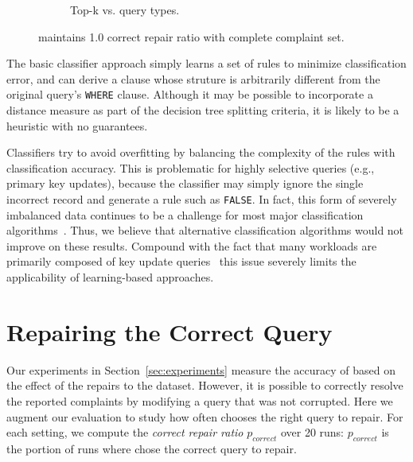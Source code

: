 \begin{description}[leftmargin=0mm, topsep=0mm, itemsep=0mm, parsep=1mm]
\begin{figure}[t]
\begin{subfigure} [t]{.3\textwidth}
    \vspace*{-.25in}
    \caption{Top-k vs. query types. }
    \vspace*{-.1in}
    \label{f:noiseratio} 
    \end{subfigure}
   \caption{ \sys maintains 1.0 correct repair ratio with complete complaint set. }
   \vspace*{-.1in}
   \label{fig:truerate}
  \end{figure}
\item [Structurally Different \texttt{WHERE} Clause Results.] 
The basic classifier approach simply learns a set of rules to minimize
classification error, and can derive a clause whose struture is arbitrarily 
different from the original query's \texttt{WHERE} clause.
Although it may be possible to incorporate a distance measure as part of the decision tree
splitting criteria, it is likely to be a heuristic with no guarantees.


\item [High Selectivity, Low Precision.]
Classifiers try to avoid overfitting by balancing the complexity of the rules with classification accuracy.
This is problematic for highly selective queries (e.g., primary key updates), because the classifier
may simply ignore the single incorrect record and generate a rule such as \texttt{FALSE}.
In fact, this form of severely imbalanced data continues to be a challenge for most major classification algorithms~\cite{he2009learning, galar2012review}. 
Thus, we believe that alternative classification algorithms would not improve on these results. 
Compound with the fact that many workloads are primarily composed of
key update queries~\cite{oltpbench} this issue severely limits the
applicability of learning-based approaches.

\end{description}


\section{Repairing the Correct Query}
\label{app:index}


Our experiments in Section~\ref{sec:experiments} measure the accuracy of \sys
based on the effect of the repairs to the dataset. However, it is possible to
correctly resolve the reported complaints by modifying a query that was not
corrupted. Here we augment our evaluation to study how often \sys chooses the
right query to repair.  For each setting, we compute the \emph{correct repair
ratio} $p_{correct}$ over 20 runs: $p_{correct}$ is the portion of runs where \sys
chose the correct query to repair.

